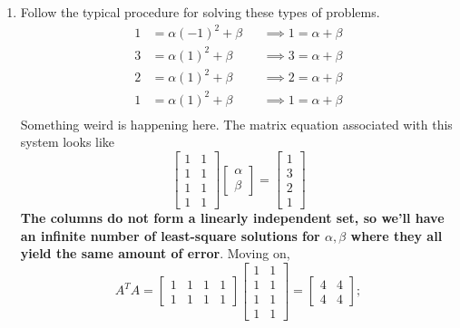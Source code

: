 \begin{enumerate}
\begin{enumerate}
					projection are just its new coordinates under the basis formed by \(\mathcal{B} = \{\vec{u}_1, \vec{u}_2\}.\) (If you tell me the
					projection, you're also telling me the coordinates in this case!) This alone is enough to tell us that \(\vec{x} = 5\vec{u}_1 + 3\vec{u}_2.\)
				\item Follow the typical procedure for solving these types of problems.
					\[\begin{aligned}
						1 &= \alpha (-1)^2 + \beta &&\implies 1 = \alpha + \beta \\
						3 &= \alpha (1)^2  + \beta &&\implies 3 = \alpha + \beta \\
						2 &= \alpha (1)^2  + \beta &&\implies 2 = \alpha + \beta \\
						1 &= \alpha (1)^2  + \beta &&\implies 1 = \alpha + \beta \\
					\end{aligned}\]
					Something weird is happening here. The matrix equation associated with this system looks like 
					\[\begin{bmatrix}1 & 1 \\ 1 & 1 \\ 1 & 1 \\ 1 & 1\end{bmatrix}\begin{bmatrix}\alpha \\ \beta\end{bmatrix} 
					  = \begin{bmatrix}1 \\ 3 \\ 2 \\ 1\end{bmatrix}\]
					\textbf{The columns do not form a linearly independent set, so we'll have an infinite number of least-square solutions for 
					\(\alpha, \beta\) where they all yield the same amount of error}. Moving on,
					\[A^TA = \begin{bmatrix}1 & 1 & 1 & 1 \\ 1 & 1 & 1 & 1\end{bmatrix}
					\begin{bmatrix}1 & 1 \\ 1 & 1 \\ 1 & 1 \\ 1 & 1\end{bmatrix} = \begin{bmatrix}4 & 4 \\ 4 & 4\end{bmatrix};\]


\end{enumerate}
\end{enumerate}
